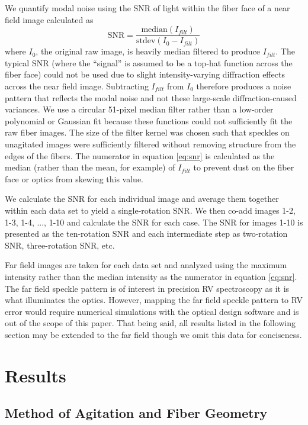 \documentclass[twocolumn]{emulateapj}
\begin{document}
We quantify modal noise using the SNR of light within the fiber face of a near field image calculated as
\begin{equation}
\mathrm{SNR} = \frac{\mathrm{median}(I_{filt})}{\mathrm{stdev}(I_0 - I_{filt})}
\label{eq:snr}
\end{equation}
where $I_0$, the original raw image, is heavily median filtered to produce $I_{filt}$. The typical SNR (where the ``signal'' is assumed to be a top-hat function across the fiber face) could not be used due to slight intensity-varying diffraction effects across the near field image. Subtracting $I_{filt}$ from $I_0$ therefore produces a noise pattern that reflects the modal noise and not these large-scale diffraction-caused variances. We use a circular 51-pixel median filter rather than a low-order polynomial or Gaussian fit because these functions could not sufficiently fit the raw fiber images. The size of the filter kernel was chosen such that speckles on unagitated images were sufficiently filtered without removing structure from the edges of the fibers. The numerator in equation \ref{eq:snr} is calculated as the median (rather than the mean, for example) of $I_{filt}$ to prevent dust on the fiber face or optics from skewing this value.

We calculate the SNR for each individual image and average them together within each data set to yield a single-rotation SNR. We then co-add images 1-2, 1-3, 1-4, ..., 1-10 and calculate the SNR for each case. The SNR for images 1-10 is presented as the ten-rotation SNR and each intermediate step as two-rotation SNR, three-rotation SNR, etc.

Far field images are taken for each data set and analyzed using the maximum intensity rather than the median intensity as the numerator in equation \ref{eq:snr}. The far field speckle pattern is of interest in precision RV spectroscopy as it is what illuminates the optics. However, mapping the far field speckle pattern to RV error would require numerical simulations with the optical design software and  is out of the scope of this paper. That being said, all results listed in the following section may be extended to the far field though we omit this data for conciseness.

\section{Results}
\label{sec:results}

\subsection{Method of Agitation and Fiber Geometry}\
\label{subsec:ag_snr}
\end{document}
